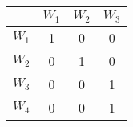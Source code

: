 \vspace{-0.1cm}
\begin{table}[h]
    \centering
    \begin{tabular}{|c|c|c|c|}
        \hline
        \textbf{} & \textbf{$W_1$} & \textbf{$W_2$} & \textbf{$W_3$} \\
        \hline
        \textbf{$W_1$} & 1 & 0 & 0 \\
        \textbf{$W_2$} & 0 & 1 & 0 \\
        \textbf{$W_3$} & 0 & 0 & 1 \\
        \textbf{$W_4$} & 0 & 0 & 1 \\
        \hline
    \end{tabular}
\end{table}